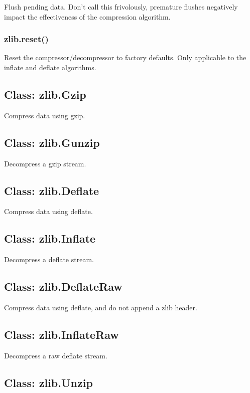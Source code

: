 Flush pending data. Don't call this frivolously, premature flushes
negatively impact the effectiveness of the compression algorithm.

\subsubsection{zlib.reset()}

Reset the compressor/decompressor to factory defaults. Only applicable
to the inflate and deflate algorithms.

\subsection{Class: zlib.Gzip}

Compress data using gzip.

\subsection{Class: zlib.Gunzip}

Decompress a gzip stream.

\subsection{Class: zlib.Deflate}

Compress data using deflate.

\subsection{Class: zlib.Inflate}

Decompress a deflate stream.

\subsection{Class: zlib.DeflateRaw}

Compress data using deflate, and do not append a zlib header.

\subsection{Class: zlib.InflateRaw}

Decompress a raw deflate stream.

\subsection{Class: zlib.Unzip}

